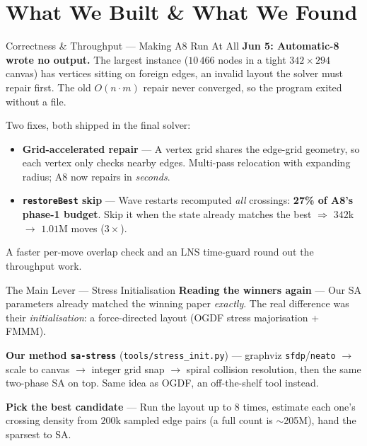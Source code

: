\section{What We Built \& What We Found}

\begin{frame}{Correctness \& Throughput --- Making A8 Run At All}
  \textbf{Jun 5: Automatic-8 wrote no output.} The largest instance ($10\,466$ nodes
  in a tight $342{\times}294$ canvas) has vertices sitting on foreign edges, an
  invalid layout the solver must repair first. The old $O(n\cdot m)$ repair never
  converged, so the program exited without a file.
  \medskip

  Two fixes, both shipped in the final solver:
  \begin{itemize}
    \item \textbf{Grid-accelerated repair} --- A vertex grid shares the edge-grid
          geometry, so each vertex only checks nearby edges. Multi-pass relocation
          with expanding radius; A8 now repairs in \emph{seconds}.
    \item \textbf{\texttt{restoreBest} skip} --- Wave restarts recomputed \emph{all}
          crossings: \textbf{27\% of A8's phase-1 budget}. Skip it when the state
          already matches the best $\Rightarrow$ $342$k $\to$ $1.01$M moves
          (\textbf{$3\times$}).
  \end{itemize}
  \medskip
  \footnotesize A faster per-move overlap check and an LNS time-guard round out the
  throughput work.
\end{frame}

\begin{frame}{The Main Lever --- Stress Initialisation}
  \textbf{Reading the winners again} --- Our SA parameters already matched the winning
  paper \emph{exactly}. The real difference was their \emph{initialisation}: a
  force-directed layout (OGDF stress majorisation + FMMM).
  \medskip

  \textbf{Our method \texttt{sa-stress}} (\texttt{tools/stress\_init.py}) --- graphviz
  \texttt{sfdp}/\texttt{neato} $\to$ scale to canvas $\to$ integer grid snap $\to$
  spiral collision resolution, then the same two-phase SA on top. Same idea as OGDF,
  an off-the-shelf tool instead.
  \medskip

  \textbf{Pick the best candidate} --- Run the layout up to 8 times, estimate each
  one's crossing density from $200$k sampled edge pairs (a full count is $\sim$205M),
  hand the sparsest to SA.
\end{frame}

